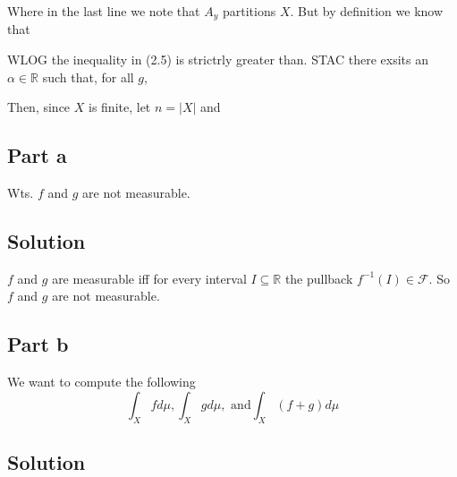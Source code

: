 Where in the last line we note that $A_y$ partitions $X$.
But by definition we know that

WLOG the inequality in (2.5) is strictrly greater than. STAC there exsits an $\alpha \in \mathbb{R}$ such that, for all $g$,

Then, since $X$ is finite, let $n = |X|$ and

\subsection*{Part a}
Wts. $f$ and $g$ are not measurable.
\subsection*{Solution}
$f$ and $g$ are measurable iff for every interval $I \subseteq \mathbb{R}$ the pullback $f^{-1}(I) \in \mathcal{F}$.
So $f$ and $g$ are not measurable.

\subsection*{Part b}
We want to compute the following
$$\int_X f d\mu, \int_X g d\mu, \textrm{ and} \int_X(f+g)d\mu$$

\subsection*{Solution}


